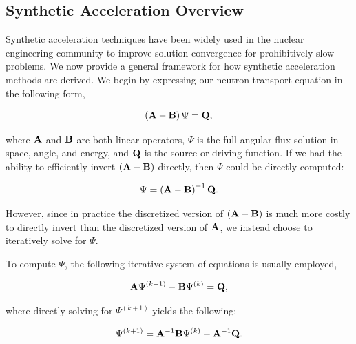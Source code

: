 \subsection{Synthetic Acceleration Overview}
\label{sec::DSA_Introduction_SA}

Synthetic acceleration techniques have been widely used in the nuclear engineering community to improve solution convergence for prohibitively slow problems. We now provide a general framework for how synthetic acceleration methods are derived. We begin by expressing our neutron transport equation in the following form,

\begin{equation}
\label{eq::DSA_simple_trans_eq_w_ops}
\left(  {\bf A} - {\bf B}  \right) \Psi = {\bf Q} ,
\end{equation}

\noindent where ${\bf A}$ and ${\bf B}$ are both linear operators, $\Psi$ is the full angular flux solution in space, angle, and energy, and ${\bf Q}$ is the source or driving function. If we had the ability to efficiently invert $\left(  {\bf A} - {\bf B}  \right)$ directly, then $\Psi$ could be directly computed:

\begin{equation}
\label{eq::DSA_simple_trans_eq_w_ops_inverted}
\Psi = \left(  {\bf A} - {\bf B}  \right)^{-1} {\bf Q} .
\end{equation}

\noindent However, since in practice the discretized version of $\left(  {\bf A} - {\bf B}  \right)$ is much more costly to directly invert than the discretized version of ${\bf A}$, we instead choose to iteratively solve for $\Psi$.

To compute $\Psi$, the following iterative system of equations is usually employed,

\begin{equation}
\label{eq::DSA_simple_trans_eq_w_ops_iterates}
 {\bf A} \Psi^{(k+1)} - {\bf B}  \Psi^{(k)} = {\bf Q} ,
\end{equation}

\noindent where directly solving for $\Psi^{(k+1)}$ yields the following:

\begin{equation}
\label{eq::DSA_simple_trans_eq_sol_w_ops_iterates}
 \Psi^{(k+1)} =  {\bf A}^{-1} {\bf B}  \Psi^{(k)} +  {\bf A}^{-1} {\bf Q} .
\end{equation}

